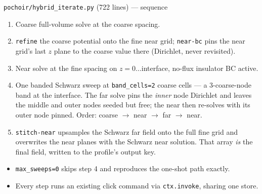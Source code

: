 \documentclass[10pt,aspectratio=169]{beamer}
\newcommand{\ti}[1]{\texttt{\footnotesize #1}}
\begin{document}
\begin{frame}{\texttt{pochoir/hybrid\_iterate.py} (722 lines) --- sequence}
  \begin{enumerate}\small
  \item Coarse full-volume solve at the coarse spacing.
  \item \ti{refine} the coarse potential onto the fine near grid; \ti{near-bc} pins the
        near grid's last $z$ plane to the coarse value there (Dirichlet, never revisited).
  \item Near solve at the fine spacing on $z=0\ldots$interface, no-flux insulator BC active.
  \item One banded Schwarz sweep at \ti{band\_cells=2} coarse cells --- a 3-coarse-node band
        at the interface. The far solve pins the \emph{inner} node Dirichlet and leaves the
        middle and outer nodes seeded but free; the near then re-solves with its outer node
        pinned. Order: coarse $\rightarrow$ near $\rightarrow$ far $\rightarrow$ near.
  \item \ti{stitch-near} upsamples the Schwarz far field onto the full fine grid and
        overwrites the near planes with the Schwarz near solution. That array \emph{is} the
        final field, written to the profile's output key.
  \end{enumerate}
  \begin{itemize}\small
  \item \ti{max\_sweeps=0} skips step 4 and reproduces the one-shot path exactly.
  \item Every step runs an existing click command via \ti{ctx.invoke}, sharing one store.
  \end{itemize}
\end{frame}
\end{document}
